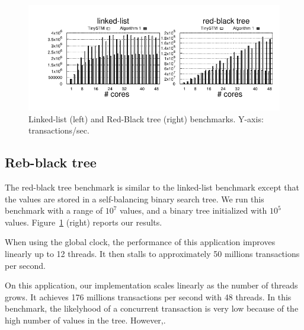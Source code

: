 \begin{figure}[!t]
	\centering
	\includegraphics[scale = 1.0]{results/intset/ll-rb.pdf}
	\caption{Linked-list (left) and Red-Black tree (right) benchmarks. Y-axis: transactions/sec. \label{fig:benchmarking:llrb}}
\end{figure}

\subsection{Reb-black tree}

The red-black tree benchmark is similar to the linked-list benchmark except that the values are stored in a self-balancing binary search tree. 
We run this benchmark with a range of $10^7$ values, and a binary tree initialized with $10^5$ values.
Figure~\ref{fig:benchmarking:llrb} (right) reports our results.

When using the global clock, the performance of this application improves linearly up to 12 threads. 
It then stalls to approximately 50 millions transactions per second.

On this application, our implementation scales linearly as the number of threads grows. 
It achieves 176 millions transactions per second with 48 threads.
%
In this benchmark, the likelyhood of a concurrent transaction is very low because of the high number of values in the tree. However,.
%
